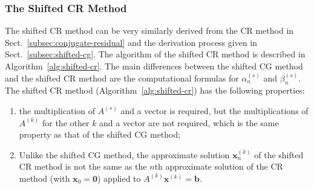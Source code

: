 \subsubsection{{The Shifted CR Method}}\label{subsec:shifted-cr}
{The shifted CR method can be very similarly derived from the CR method in Sect.\ \ref{subsec:conjugate-residual} and the derivation process given in Sect.\ \ref{subsec:shifted-cg}. The algorithm of the shifted CR method is described in Algorithm\ \ref{alg:shifted-cr}.}
{The main differences between the shifted CG method and the shifted CR method are the computational formulas for $\alpha_n^{(s)}$ and $\beta_n^{(s)}$. The shifted CR method (Algorithm\ \ref{alg:shifted-cr}) has the following properties:}
\begin{enumerate}
\item {the multiplication of $A^{(s)}$ and a vector is required, but the multiplications of $A^{(k)}$ for the other $k$ and a vector are not required, which is the same property as that of the shifted CG method;}
\item {Unlike the shifted CG method, the approximate solution $\bm x_n^{(k)}$ of the shifted CR method is not the same as the $n$th approximate solution of the CR method (with $\bm x_0=\bm0$) applied to $A^{(k)}\bm x^{(k)}=\bm b$.}
\end{enumerate}

